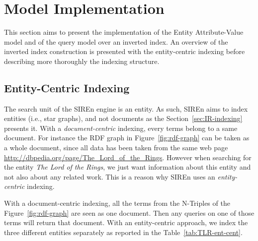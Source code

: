 \section{Model Implementation}

This section aims to present the implementation of the Entity Attribute-Value
model and of the query model over an inverted index. An overview of the
inverted index construction is presented with the entity-centric indexing
before describing more thoroughly the indexing structure.

\subsection{Entity-Centric Indexing}
\label{sec:ent-cent-indexing}

The search unit of the SIREn engine is an entity. As such,
SIREn aims to index entities (i.e., star graphs), and not documents
as the Section~\ref{sec:IR-indexing} presents it.
With a \emph{document-centric} indexing, every terms belong to a same document.
For instance the RDF graph in Figure~\ref{fig:rdf-graph} can be
taken as a whole document, since all data has been taken from the same web page
\url{http://dbpedia.org/page/The_Lord_of_the_Rings}. However when searching for
the entity \emph{The Lord of the Rings}, we just want information about this
entity and not also about any related work. This is a reason why SIREn uses an
\emph{entity-centric} indexing.

With a document-centric indexing, all the terms from the N-Triples of the
Figure~\ref{fig:rdf-graph} are seen as one document.
Then any queries on one of those terms will return that document. With an
entity-centric approach, we index the three different entities separately as
reported in the Table~\ref{tab:TLR-ent-cent}.

